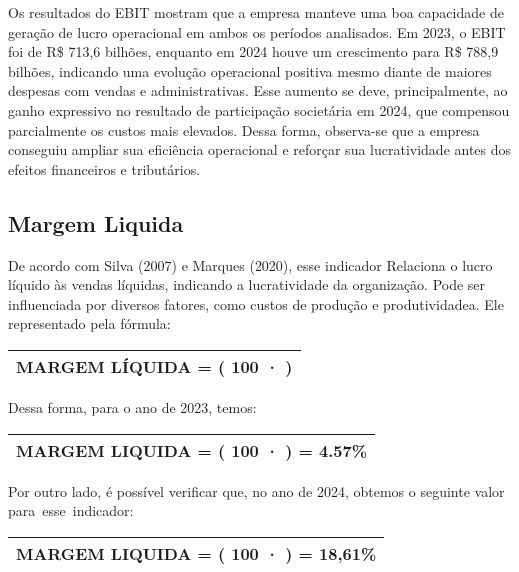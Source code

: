 \documentclass[1pt,a4paper]{article}
\begin{document}
	Os resultados do EBIT mostram que a empresa manteve uma boa capacidade de geração de lucro operacional em ambos os períodos analisados. Em 2023, o EBIT foi de R\$ 713,6 bilhões, enquanto em 2024 houve um crescimento para R\$ 788,9 bilhões, indicando uma evolução operacional positiva mesmo diante de maiores despesas com vendas e administrativas. Esse aumento se deve, principalmente, ao ganho expressivo no resultado de participação societária em 2024, que compensou parcialmente os custos mais elevados. Dessa forma, observa-se que a empresa conseguiu ampliar sua eficiência operacional e reforçar sua lucratividade antes dos efeitos financeiros e tributários.

	\subsection{Margem Liquida}
	 
	\hspace*{1.5cm}De acordo com Silva (2007) e Marques (2020), esse indicador Relaciona o lucro líquido às vendas líquidas, indicando a lucratividade da organização. Pode ser influenciada por diversos fatores, como custos de produção e produtividadea. Ele representado pela fórmula:
	\begin{center}
		\begin{tabular}{|c|}
			\hline
			 MARGEM LÍQUIDA = \left( 100 · \left[ \frac{LUCRO \, LIQUIDO}{ VENDAS \, LÍQUIDAS} \right] \right)  \\
			\hline
		\end{tabular}
	\end{center}
	Dessa forma, para o ano de 2023, temos:	
	\begin{center}
		\begin{tabular}{|c|}
			\hline
			MARGEM LIQUIDA  = \left( 100 · \left[ \frac{140.419}{3.075.471} \right] \right) = 4.57\% \\
			\hline
		\end{tabular}
	\end{center}
	Por outro lado, é possível verificar que, no ano de 2024, obtemos o seguinte valor para esse indicador:
		\begin{center}
		\begin{tabular}{|c|}
			\hline
			MARGEM LIQUIDA  = \left( 100 · \left[ \frac{650.143}{3.493.657} \right] \right) = 18,61\% \\
			\hline
		\end{tabular}
	\end{center}
	
\end{document}

